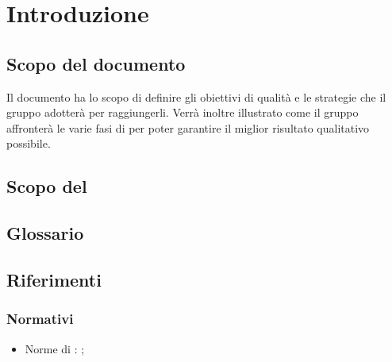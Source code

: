 \documentclass[PdQ.tex]{subfiles}
\begin{document}
\section{Introduzione}
	\subsection{Scopo del documento}
		Il documento ha lo scopo di definire gli obiettivi di qualità e le strategie che il gruppo \GRUPPO{}
		adotterà per raggiungerli. Verrà inoltre illustrato come il gruppo affronterà le varie fasi di 
		per poter garantire il miglior risultato qualitativo possibile.
	\subsection{Scopo del }
		\SCOPO
	\subsection{Glossario}
		\GLOSSARIO
	\subsection{Riferimenti}
		\subsubsection{Normativi}
			\begin{itemize}
				\item Norme di : \NPdoc{};
			\end{itemize}
\end{document}
